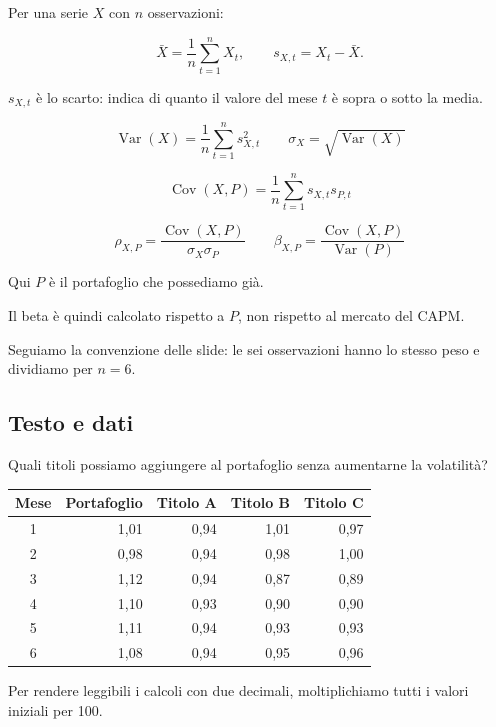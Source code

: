 \noindent Per una serie $X$ con $n$ osservazioni:

\[
\bar X=\frac{1}{n}\sum_{t=1}^{n}X_t,
\qquad
s_{X,t}=X_t-\bar X.
\]

\noindent $s_{X,t}$ è lo scarto:
indica di quanto il valore del mese $t$
è sopra o sotto la media.

\[
\boxed{
\operatorname{Var}(X)
=
\frac{1}{n}\sum_{t=1}^{n}s_{X,t}^2
}
\qquad
\boxed{
\sigma_X=\sqrt{\operatorname{Var}(X)}
}
\]

\[
\boxed{
\operatorname{Cov}(X,P)
=
\frac{1}{n}\sum_{t=1}^{n}s_{X,t}s_{P,t}
}
\]

\[
\boxed{
\rho_{X,P}
=
\frac{\operatorname{Cov}(X,P)}
{\sigma_X\sigma_P}
}
\qquad
\boxed{
\beta_{X,P}
=
\frac{\operatorname{Cov}(X,P)}
{\operatorname{Var}(P)}
}
\]

\noindent Qui $P$ è il portafoglio
che possediamo già.

\noindent Il beta è quindi calcolato
rispetto a $P$,
non rispetto al mercato del CAPM.

\noindent Seguiamo la convenzione delle slide:
le sei osservazioni hanno lo stesso peso
e dividiamo per $n=6$.


\subsection*{Testo e dati}

\noindent Quali titoli possiamo aggiungere
al portafoglio senza aumentarne la volatilità?

\begin{center}
    \begin{tabular}{|c|r|r|r|r|}
        \hline
        \textbf{Mese}
        & \textbf{Portafoglio}
        & \textbf{Titolo A}
        & \textbf{Titolo B}
        & \textbf{Titolo C} \\
        \hline
        1 & 1,01 & 0,94 & 1,01 & 0,97 \\
        2 & 0,98 & 0,94 & 0,98 & 1,00 \\
        3 & 1,12 & 0,94 & 0,87 & 0,89 \\
        4 & 1,10 & 0,93 & 0,90 & 0,90 \\
        5 & 1,11 & 0,94 & 0,93 & 0,93 \\
        6 & 1,08 & 0,94 & 0,95 & 0,96 \\
        \hline
    \end{tabular}
\end{center}

\noindent Per rendere leggibili i calcoli
con due decimali, moltiplichiamo
tutti i valori iniziali per 100.

